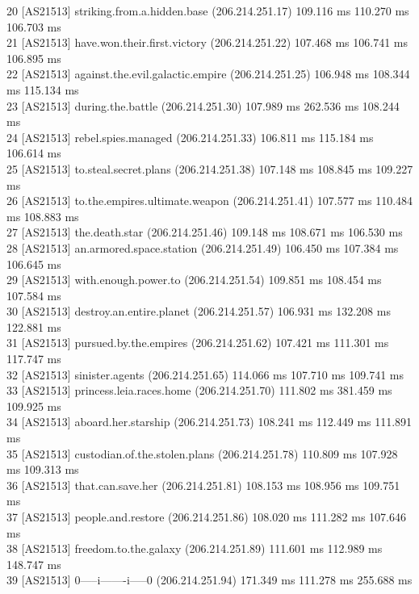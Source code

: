 \documentclass[11pt]{article}
\begin{document}
20  [AS21513] striking.from.a.hidden.base (206.214.251.17)  109.116 ms  110.270 ms  106.703 ms\\
21  [AS21513] have.won.their.first.victory (206.214.251.22)  107.468 ms  106.741 ms  106.895 ms\\
22  [AS21513] against.the.evil.galactic.empire (206.214.251.25)  106.948 ms  108.344 ms  115.134 ms\\
23  [AS21513] during.the.battle (206.214.251.30)  107.989 ms  262.536 ms  108.244 ms\\
24  [AS21513] rebel.spies.managed (206.214.251.33)  106.811 ms  115.184 ms  106.614 ms\\
25  [AS21513] to.steal.secret.plans (206.214.251.38)  107.148 ms  108.845 ms  109.227 ms\\
26  [AS21513] to.the.empires.ultimate.weapon (206.214.251.41)  107.577 ms  110.484 ms  108.883 ms\\
27  [AS21513] the.death.star (206.214.251.46)  109.148 ms  108.671 ms  106.530 ms\\
28  [AS21513] an.armored.space.station (206.214.251.49)  106.450 ms  107.384 ms  106.645 ms\\
29  [AS21513] with.enough.power.to (206.214.251.54)  109.851 ms  108.454 ms  107.584 ms\\
30  [AS21513] destroy.an.entire.planet (206.214.251.57)  106.931 ms  132.208 ms  122.881 ms\\
31  [AS21513] pursued.by.the.empires (206.214.251.62)  107.421 ms  111.301 ms  117.747 ms\\
32  [AS21513] sinister.agents (206.214.251.65)  114.066 ms  107.710 ms  109.741 ms\\
33  [AS21513] princess.leia.races.home (206.214.251.70)  111.802 ms  381.459 ms  109.925 ms\\
34  [AS21513] aboard.her.starship (206.214.251.73)  108.241 ms  112.449 ms  111.891 ms\\
35  [AS21513] custodian.of.the.stolen.plans (206.214.251.78)  110.809 ms  107.928 ms  109.313 ms\\
36  [AS21513] that.can.save.her (206.214.251.81)  108.153 ms  108.956 ms  109.751 ms\\
37  [AS21513] people.and.restore (206.214.251.86)  108.020 ms  111.282 ms  107.646 ms\\
38  [AS21513] freedom.to.the.galaxy (206.214.251.89)  111.601 ms  112.989 ms  148.747 ms\\
39  [AS21513] 0-----i-------i-----0 (206.214.251.94)  171.349 ms  111.278 ms  255.688 ms\\
\end{document}
